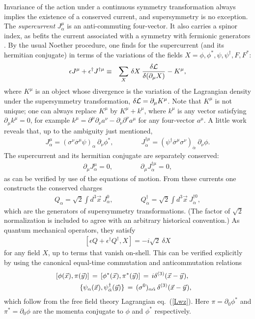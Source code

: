 \documentclass[12pt]{article}
\def\beq{\begin{eqnarray}}
\def\eeq{\end{eqnarray}}
\def\lagr{{\cal L}}
\def\sigmabar{\overline\sigma}
\begin{document}
Invariance of the action under a continuous symmetry transformation always implies
the existence of a conserved current, and supersymmetry is no exception.
The {\it supercurrent} $J^\mu_\alpha$ is an anti-commuting four-vector. It
also carries a spinor index, as befits the current associated with a
symmetry with fermionic generators \cite{ref:supercurrent}. By the usual
Noether procedure, one finds for the supercurrent (and its hermitian
conjugate) in terms of the variations of the fields
$X=\phi,\phi^*,\psi,\psi^\dagger,F,F^*$: 
\beq
\epsilon J^\mu + \epsilon^\dagger J^{\dagger\mu}
&\equiv & 
\sum_X \, \delta X\>{\delta\lagr\over \delta(\partial_\mu X)} 
- K^\mu ,
\label{Noether}
\eeq
where $K^\mu$ is an object whose divergence is the variation of the
Lagrangian density under the supersymmetry transformation, $\delta \lagr =
\partial_\mu K^\mu$. Note that $K^\mu$ is not unique; one can always
replace $K^\mu$ by $K^\mu + k^\mu$, where $k^\mu$ is any vector satisfying
$\partial_\mu k^\mu=0$, for example $k^\mu = \partial^\mu \partial_\nu
a^\nu - \partial_\nu\partial^\nu a^\mu$ for any four-vector $a^\mu$. 
A little work reveals that, up to
the ambiguity just mentioned,
\beq
J^\mu_\alpha = (\sigma^\nu\sigmabar^\mu\psi)_\alpha\> \partial_\nu \phi^*
, \qquad\qquad
J^{\dagger\mu}_{\dot{\alpha}}
=  (\psi^\dagger \sigmabar^\mu \sigma^\nu)_{\dot{\alpha}}
\> \partial_\nu \phi .
\label{WZsupercurrent}
\eeq
The supercurrent and its hermitian conjugate are separately conserved:
\beq
\partial_\mu J^\mu_\alpha = 0,\qquad\qquad
\partial_\mu J^{\dagger\mu}_{\dot{\alpha}} = 0 ,
\eeq
as can be verified by use of the equations of motion. From these currents
one constructs the conserved charges
\beq
Q_\alpha = {\sqrt{2}}\int d^3 \vec{x}\> J^0_\alpha,\qquad\qquad
Q^\dagger_{\dot{\alpha}} = {\sqrt{2}} \int d^3\vec{x} \> 
J^{\dagger 0}_{\dot{\alpha}} ,
\eeq
which are the generators of supersymmetry transformations. (The factor of
$\sqrt{2}$ normalization is included to agree with an arbitrary historical
convention.) As quantum mechanical operators, they satisfy
\beq
\left [ \epsilon Q + \epsilon^\dagger Q^\dagger , X \right ]
= -i{\sqrt{2}} \> \delta X
\label{interpolistheworstbandonearth}
\eeq
for any field $X$, up to terms that vanish on-shell. This
can be verified explicitly by using the canonical equal-time
commutation and anticommutation relations
\beq
&&[ \phi(\vec{x}), \pi(\vec{y}) ] \,=\,
[ \phi^*(\vec{x}), \pi^*(\vec{y}) ] \,=\, i \delta^{(3)}(\vec{x}-\vec{y}
\hspace{0.25mm}) , \qquad\>\>{}\\
&&
\{ 
\psi_\alpha (\vec{x}), 
\psi^\dagger_{\dot{\alpha}} (\vec{y}) \} \,=\,
(\sigma^0)_{{\alpha}\dot{\alpha}}\,\delta^{(3)}(\vec{x}-\vec{y}
\hspace{0.25mm} ), \qquad{}
\eeq
which follow from the free field theory Lagrangian eq.~(\ref{Lwz}). Here $\pi =
\partial_0 \phi^*$ and $\pi^* = \partial_0 \phi$ are the momenta conjugate
to $\phi$ and $\phi^*$ respectively.
\end{document}
